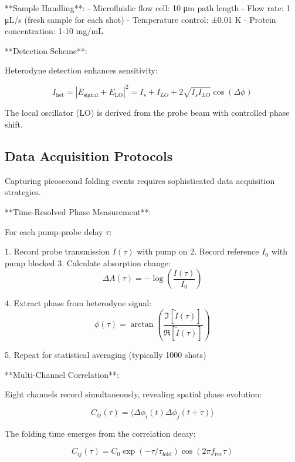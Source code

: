 \documentclass[12pt,a4paper]{report}
\begin{document}
**Sample Handling**:
- Microfluidic flow cell: 10 μm path length
- Flow rate: 1 μL/s (fresh sample for each shot)
- Temperature control: ±0.01 K
- Protein concentration: 1-10 mg/mL

**Detection Scheme**:

Heterodyne detection enhances sensitivity:

\begin{equation}
I_{\text{het}} = |E_{\text{signal}} + E_{\text{LO}}|^2 = I_s + I_{LO} + 2\sqrt{I_s I_{LO}} \cos(\Delta\phi)
\end{equation}

The local oscillator (LO) is derived from the probe beam with controlled phase shift.

\subsection{Data Acquisition Protocols}

Capturing picosecond folding events requires sophisticated data acquisition strategies.

**Time-Resolved Phase Measurement**:

For each pump-probe delay $\tau$:

1. Record probe transmission $I(\tau)$ with pump on
2. Record reference $I_0$ with pump blocked
3. Calculate absorption change:
   \begin{equation}
   \Delta A(\tau) = -\log\left(\frac{I(\tau)}{I_0}\right)
   \end{equation}

4. Extract phase from heterodyne signal:
   \begin{equation}
   \phi(\tau) = \arctan\left(\frac{\Im[\tilde{I}(\tau)]}{\Re[\tilde{I}(\tau)]}\right)
   \end{equation}

5. Repeat for statistical averaging (typically 1000 shots)

**Multi-Channel Correlation**:

Eight channels record simultaneously, revealing spatial phase evolution:

\begin{equation}
C_{ij}(\tau) = \langle \Delta\phi_i(t) \Delta\phi_j(t + \tau) \rangle
\end{equation}

The folding time emerges from the correlation decay:

\begin{equation}
C_{ij}(\tau) = C_0 \exp(-\tau/\tau_{\text{fold}}) \cos(2\pi f_{\text{rec}} \tau)
\end{equation}
\end{document}
